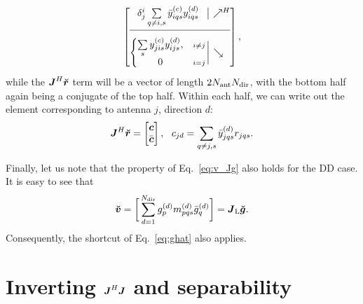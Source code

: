 \documentclass[useAMS,usenatbib]{mn2e}
\makeatletter
\newcommand{\mat}[1]{{\bmath{#1}}}
\newcommand{\JJ}{\mat{J}} %
\newcommand{\MM}{\mat{M}}
\newcommand{\GG}{\mat{G}}
\newcommand{\Matrix}[2]{\left [ \begin{array}{@{}#1@{}}#2\end{array} \right ]}
\newcommand{\AUG}[1]{\bmath{\breve{#1}}}
\newcommand{\Gg}{\AUG{g}}
\newcommand{\Rr}{\AUG{r}}
\newcommand{\Vv}{\AUG{v}}
\newcommand{\TOP}{\mathrm{U}}%
\newcommand{\LEFT}{\mathrm{L}}
\newcommand{\Rop}[1]{\mathcal{R}_{{#1}}}
\newcommand{\Lop}[1]{\mathcal{L}_{{#1}}}
\numberwithin{equation}{section} %
\providecommand{\DIFaddbegin}{} %
\providecommand{\DIFdelend}{} %
\makeatother
\begin{document}
\begin{equation}%

\DIFdelend \DIFaddbegin \JHJblocks{
  \delta^i_j \sum\limits_{q\ne i,s} \yycH_{iqs} \yyd_{iqs} 
}{
  \left \{ 
  \begin{array}{@{}cc@{}}
   \sum\limits_{s} \yyc_{jis} \yyd_{ijs},&{\scriptstyle i\ne j} \\
   0 &{\scriptstyle i=j}
  \end{array} \right . 
},
\label{eq:JHJ:DD:unpol}
\end{equation}
while the $\JJ^H\Rr$ term will be a vector of length $2N_\mathrm{ant}N_\mathrm{dir}$, with the bottom half again being
a conjugate of the top half. Within each half, we can write out the element corresponding to 
antenna $j$, direction $d$: 
\begin{equation}
\label{eq:JHR:DD:unpol}
\JJ^H\Rr = \Matrix{c}{\bmath{c}\\\bar{\bmath{c}}},~~c_{jd} = \sum\limits_{q\ne j,s} 
\yydH_{jqs} r_{jqs}.
\end{equation}

Finally, let us note that the property of Eq.~\ref{eq:v_Jg} also holds for the DD case. It is easy to see that
\begin{equation}
\label{eq:v_Jg:dd}
\Vv = \bigg [ \sum_{d=1}^{\Nd} \ggd_p \mmd_{pqs} \ggdH_q \bigg ] = \JJ_\LEFT \Gg.
\end{equation}
Consequently, the shortcut of Eq.~\ref{eq:ghat} also applies.

\section{Inverting $\JJ^H\JJ$ and separability}
\label{sec:separability}
\end{document}
